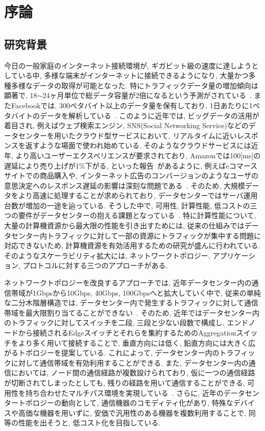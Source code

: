 \chapter{序論}

\section{研究背景}
今日の一般家庭のインターネット接続環境が, ギガビット級の速度に達しようとしている中, 多様な端末がインターネットに接続できるようになり,
大量かつ多種多様なデータの取得が可能となった.
特にトラフィックデータ量の増加傾向は顕著で, 18$\sim$24ヶ月単位で総データ容量が2倍になるという予測がされている~\cite{IBM_rep}.
またFacebookでは, 300ペタバイト以上のデータ量を保有しており, 1日あたりに1ペタバイトのデータを解析している~\cite{presto}.
このように近年では, ビッグデータの活用が着目され, 例えばウェブ検索エンジン, SNS(Social Networking
Service)などのデータセンターを用いたクラウド型サービスにおいて, リアルタイムに近いレスポンスを返すような場面で使われ始めている.
そのようなクラウドサービスには近年, より高いユーザーエクスペリエンスが要求されており,
Amazonでは100[ms]の遅延により売り上げが1\%下がる, といった報告~\cite{amazon}があるように,
例えばeコマースサイトでの商品購入や,
インターネット広告のコンバージョンのようなユーザの意思決定へのレスポンス遅延の影響は深刻な問題である~\cite{customer_impact}.
そのため, 大規模データをより高速に処理することが求められており, データセンターではサーバ運用台数が増加の一途を辿っている.
そうした中で, 可用性, 計算性能, 低コストの三つの要件がデータセンターの抱える課題となっている~\cite{requirement}.
特に計算性能について, 大量の計算機資源から最大限の性能を引き出すためには,
従来の仕組みではデータセンター内トラフィックに対して一部の資源にトラフィックが集中する問題に対応できないため,
計算機資源を有効活用するための研究が盛んに行われている\cite{mapreduce, fattree,
dctcp, improving, detail, p_fab, synchro}.
そのようなスケーラビリティ拡大には, ネットワークトポロジー, アプリケーション, プロトコルに対する三つのアプローチがある.

ネットワークトポロジーを改良するアプローチでは, 近年データセンター内の通信帯域が1Gbpsから10Gbps, 40Gbps,
100Gbpsへと拡大していく中で, 従来の単純な二分木階層構造では,
データセンター内で発生するトラフィックに対して通信帯域を最大限割り当てることができない~\cite{fattree}.
そのため,
近年ではデータセンター内のトラフィックに対してスイッチを二段, 三段と少ない段数で構成し,
エンドノードから接続されるEdgeスイッチとそれらを集約するためのAggregationスイッチをより多く用いて接続することで, 
垂直方向には低く, 鉛直方向には大きく広がるトポロジーを提案している. 
これによって, データセンター内のトラフィックに対して通信帯域を有効利用することができる. 
また, データセンター内の通信においては, ノード間の通信経路が複数設けられており, 仮に一つの通信経路が切断されてしまったとしても,
残りの経路を用いて通信することができる, 可用性を持ち合わせたマルチパス環境を実現している~\cite{fattree}.
さらに, 近年のデータセンタートポロジーの動向として, 通信機器のコモディティ化があり, 特殊なデバイスや高価な機器を用いずに,
安価で汎用性のある機器を複数利用することで, 同等の性能を出そうと, 低コスト化を目指している. 

